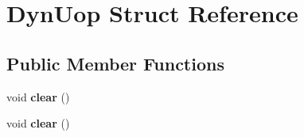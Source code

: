 \hypertarget{structDynUop}{\section{Dyn\-Uop Struct Reference}
\label{structDynUop}
}
\subsection*{Public Member Functions}
\begin{DoxyCompactItemize}
\item 
\hypertarget{structDynUop_a96f4472cb4f8cc87716dee750e5892b6}{void {\bfseries clear} ()}\label{structDynUop_a96f4472cb4f8cc87716dee750e5892b6}

\item 
\hypertarget{structDynUop_a96f4472cb4f8cc87716dee750e5892b6}{void {\bfseries clear} ()}\label{structDynUop_a96f4472cb4f8cc87716dee750e5892b6}

\end{DoxyCompactItemize}
